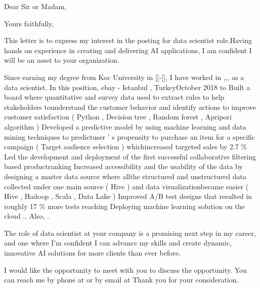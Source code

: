 \documentclass[11pt,a4paper,sans]{moderncv}        %
\begin{document}
\recipient{\quad}{\quad}
\date{February 04 2020}
\opening{Dear Sir or Madam,}
\closing{Yours faithfully,}
\makelettertitle


This letter is to express my interest in the posting for data scientist role.Having hands on experience in creating and delivering AI applications, I am confident I will be an asset to your organization.



Since earning my degree from Koc University  in []-[], I have worked in ,,, as a data scientist. In this position, ebay - Istanbul , TurkeyOctober 2018 to   Built a board where quantitative and survey data used to extract rules to help stakeholders tounderstand the customer behavior and identify actions to improve customer satisfaction ( Python , Decision tree , Random forest , Apripori algorithm )   Developed a predictive model by using machine learning and data mining techniques to predictuser ’ s propensity to purchase an item for a specific campaign ( Target audience selection ) whichincreased targeted sales by 2.7 \%   Led the development and deployment of the first successful collaborative filtering based productranking   Increased accessibility and the usability of the data by designing a master data source where allthe structured and unstructured data collected under one main source ( Hive ) and data visualizationbecame easier ( Hive , Hadoop , Scala , Data Lake )   Improved A/B test designs that resulted in roughly 17 \% more tests reaching   Deploying machine learning solution on the cloud .. Also, . 

The role of data scientist at your company is a promising next step in my career, and one where I’m confident I can advance my skills and create dynamic, innovative AI solutions for more clients than ever before.


I would like the opportunity to meet with you to discuss the opportunity. You can reach me by phone at  or by email at 
Thank you for your consideration.


\makeletterclosing
\end{document}
